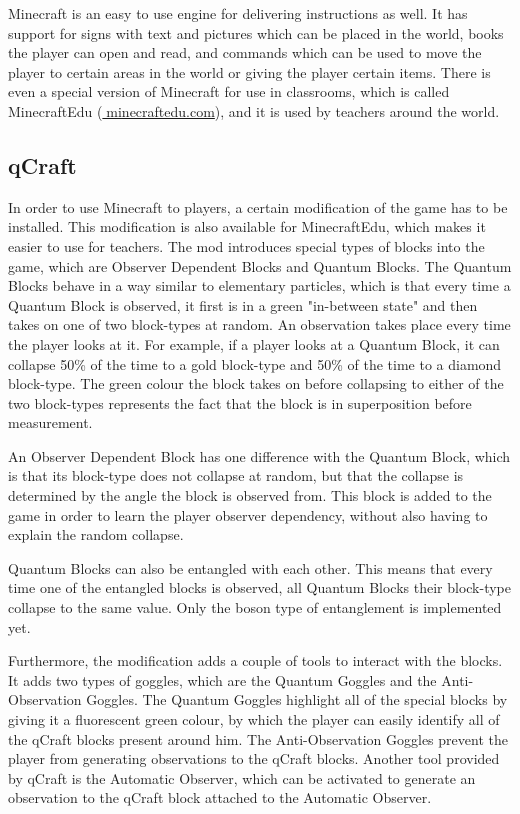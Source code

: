 \documentclass[11pt,twoside]{report} %
\begin{document}
Minecraft is an easy to use engine for delivering instructions as well. It has support for signs with text and pictures which can be placed in the world, books the player can open and read, and commands which can be used to move the player to certain areas in the world or giving the player certain items. There is even a special version of Minecraft for use in classrooms, which is called MinecraftEdu (\url{minecraftedu.com}), and it is used by teachers around the world.

\subsection{qCraft}

In order to use Minecraft to players, a certain modification of the game has to be installed. This modification is also available for MinecraftEdu, which makes it easier to use for teachers. The mod introduces special types of blocks into the game, which are Observer Dependent Blocks and Quantum Blocks. The Quantum Blocks behave in a way similar to elementary particles, which is that every time a Quantum Block is observed, it first is in a green "in-between state" and then takes on one of two block-types at random. An observation takes place every time the player looks at it. For example, if a player looks at a Quantum Block, it can collapse 50\% of the time to a gold block-type and 50\% of the time to a diamond block-type. The green colour the block takes on before collapsing to either of the two block-types represents the fact that the block is in superposition before measurement.

An Observer Dependent Block has one difference with the Quantum Block, which is that its block-type does not collapse at random, but that the collapse is determined by the angle the block is observed from. This block is added to the game in order to learn the player observer dependency, without also having to explain the random collapse. 

Quantum Blocks can also be entangled with each other. This means that every time one of the entangled blocks is observed, all Quantum Blocks their block-type collapse to the same value. Only the boson type of entanglement is implemented yet.

Furthermore, the modification adds a couple of tools to interact with the blocks. It adds two types of goggles, which are the Quantum Goggles and the Anti-Observation Goggles. The Quantum Goggles highlight all of the special blocks by giving it a fluorescent green colour, by which the player can easily identify all of the qCraft blocks present around him. The Anti-Observation Goggles prevent the player from generating observations to the qCraft blocks. Another tool provided by qCraft is the Automatic Observer, which can be activated to generate an observation to the qCraft block attached to the Automatic Observer.
\end{document}
